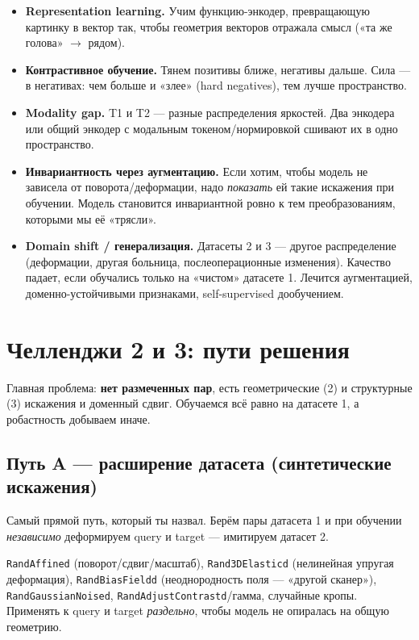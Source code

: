 \documentclass[11pt,a4paper]{article}
\begin{document}
\begin{itemize}
\item \textbf{Representation learning.} Учим функцию-энкодер, превращающую картинку в вектор так,
чтобы геометрия векторов отражала смысл («та же голова» $\to$ рядом).
\item \textbf{Контрастивное обучение.} Тянем позитивы ближе, негативы дальше. Сила — в негативах:
чем больше и «злее» (hard negatives), тем лучше пространство.
\item \textbf{Modality gap.} T1 и T2 — разные распределения яркостей. Два энкодера или общий
энкодер с модальным токеном/нормировкой сшивают их в одно пространство.
\item \textbf{Инвариантность через аугментацию.} Если хотим, чтобы модель не зависела от
поворота/деформации, надо \emph{показать} ей такие искажения при обучении. Модель становится
инвариантной ровно к тем преобразованиям, которыми мы её «трясли».
\item \textbf{Domain shift / генерализация.} Датасеты 2 и 3 — другое распределение (деформации,
другая больница, послеоперационные изменения). Качество падает, если обучались только на «чистом»
датасете 1. Лечится аугментацией, доменно-устойчивыми признаками, self-supervised дообучением.
\end{itemize}

\section{Челленджи 2 и 3: пути решения}

Главная проблема: \textbf{нет размеченных пар}, есть геометрические (2) и структурные (3)
искажения и доменный сдвиг. Обучаемся всё равно на датасете 1, а робастность добываем иначе.

\subsection{Путь A — расширение датасета (синтетические искажения)}

Самый прямой путь, который ты назвал. Берём пары датасета 1 и при обучении \emph{независимо}
деформируем query и target — имитируем датасет 2.

\begin{system}
\texttt{RandAffined} (поворот/сдвиг/масштаб), \texttt{Rand3DElasticd} (нелинейная упругая
деформация), \texttt{RandBiasFieldd} (неоднородность поля — «другой сканер»),
\texttt{RandGaussianNoised}, \texttt{RandAdjustContrastd}/гамма, случайные кропы. Применять к
query и target \emph{раздельно}, чтобы модель не опиралась на общую геометрию.
\end{system}
\end{document}
